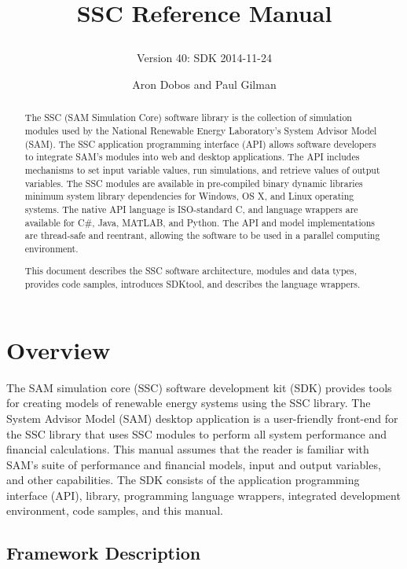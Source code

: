 \documentclass{scrartcl} %
\title{SSC Reference Manual
\subtitle{Version 40: SDK 2014-11-24}}
\author{Aron Dobos and Paul Gilman}
\begin{document}
\maketitle
\vspace{2.5in}
\begin{abstract}
The SSC (SAM Simulation Core) software library is the collection of simulation modules used by the National Renewable Energy Laboratory's  System Advisor Model (SAM).  The SSC application programming interface (API) allows software developers to integrate SAM's modules into web and desktop applications. The API includes mechanisms to set input variable values, run simulations, and retrieve values of output variables. The SSC modules are available in pre-compiled binary dynamic libraries minimum system library dependencies for Windows, OS X, and Linux operating systems. The native API language is ISO-standard C, and language wrappers are available for C\#, Java, MATLAB, and Python. The API and model implementations are thread-safe and reentrant, allowing the software to be used in a parallel computing environment.

This document describes the SSC software architecture, modules and data types, provides code samples, introduces SDKtool, and describes the language wrappers.
\end{abstract} 

\newpage
\tableofcontents
\newpage

\section{Overview}
\label{sec_overview}

The SAM simulation core (SSC) software development kit (SDK) provides tools for creating models of renewable energy systems using the SSC library. The System Advisor Model (SAM) desktop application is a user-friendly front-end for the SSC library that uses SSC modules to perform all system performance and financial calculations. This manual assumes that the reader is familiar with SAM's suite of performance and financial models, input and output variables, and other capabilities. The SDK consists of the application programming interface (API), library, programming language wrappers, integrated development environment, code samples, and this manual.

\subsection{Framework Description}
\end{document}
